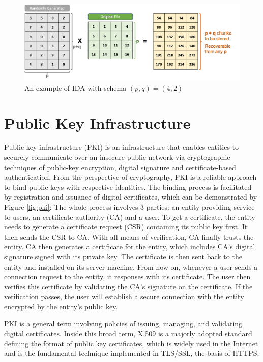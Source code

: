 \begin{figure}[hbt]
\centering
  \includegraphics[width=13cm]{figures/ida.png}
  \caption{An example of IDA with schema $(p,q)=(4,2)$}
  \label{fig:ida}
\end{figure}

\section{Public Key Infrastructure}
\label{s:publickeyinfrastructure}

Public key infrastructure (PKI) is an infrastructure that enables entities to securely communicate over an insecure public network via cryptographic techniques of public-key encryption, digital signature and certificate-based authentication. From the perspective of cryptography, PKI is a reliable approach to bind public keys with respective identities. The binding process is facilitated by registration and issuance of digital certificates, which can be demonstrated by Figure \ref{fig:pki}: The whole process involves 3 parties: an entity providing service to users, an certificate authority (CA) and a user. To get a certificate, the entity needs to generate a certificate request (CSR) containing its public key first. It then sends the CSR to CA. With all means of verification, CA finally trusts the entity. CA then generates a certificate for the entity, which includes CA's digital signature signed with its private key. The certificate is then sent back to the entity and installed on its server machine. From now on, whenever a user sends a connection request to the entity, it responses with its certificate. The user then verifies this certificate by validating the CA's signature on the certificate. If the verification passes, the user will establish a secure connection with the entity encrypted by the entity's public key.

PKI is a general term involving policies of issuing, managing, and validating digital certificates. Inside this broad term, X.509\cite{rfc4158} is a majorly adopted standard defining the format of public key certificates, which is widely used in the Internet and is the fundamental technique implemented in TLS/SSL, the basis of HTTPS.

